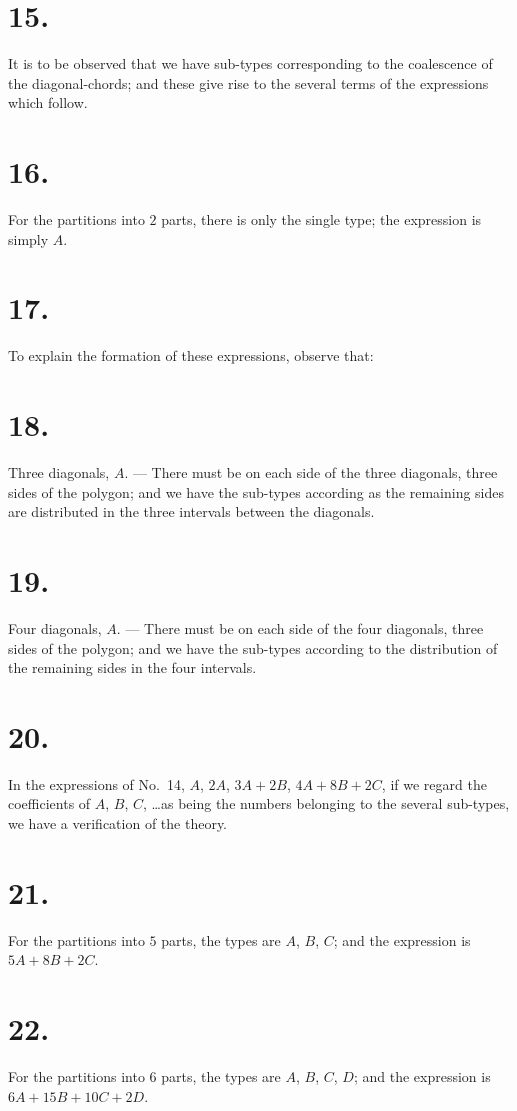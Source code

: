 \documentclass[11pt,a4paper]{book}
\begin{document}
\section*{15.}
It is to be observed that we have sub-types corresponding to the coalescence of the diagonal-chords; and these give rise to the several terms of the expressions which follow.

\section*{16.}
For the partitions into $2$ parts, there is only the single type; the expression is simply $A$.

\section*{17.}
To explain the formation of these expressions, observe that:

\section*{18.}
Three diagonals, $A$. --- There must be on each side of the three diagonals, three sides of the polygon; and we have the sub-types according as the remaining sides are distributed in the three intervals between the diagonals.

\section*{19.}
Four diagonals, $A$. --- There must be on each side of the four diagonals, three sides of the polygon; and we have the sub-types according to the distribution of the remaining sides in the four intervals.

\section*{20.}
In the expressions of No.~14, $A$, $2A$, $3A + 2B$, $4A + 8B + 2C$, if we regard the coefficients of $A$, $B$, $C$, \ldots as being the numbers belonging to the several sub-types, we have a verification of the theory.

\section*{21.}
For the partitions into $5$ parts, the types are $A$, $B$, $C$; and the expression is $5A + 8B + 2C$.

\section*{22.}
For the partitions into $6$ parts, the types are $A$, $B$, $C$, $D$; and the expression is $6A + 15B + 10C + 2D$.
\end{document}
